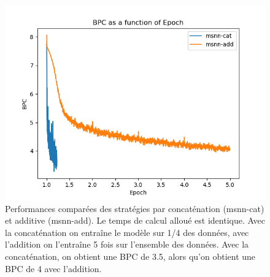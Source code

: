 \begin{figure}[H]
	\centering
	\includegraphics[width=\textwidth]{parts/appendix/reports-gmsnn/docs_esteban-latex/test_reports/comparative-bpc-msnn-det-msnn-cat.png}
	\caption[Performances comparées des stratégies additive et par concaténation]{Performances comparées des stratégies par concaténation (msnn-cat) et additive (msnn-add). Le temps de calcul alloué est identique. Avec la concaténation on entraîne le modèle sur 1/4 des données, avec l'addition on l'entraîne 5 fois sur l'ensemble des données. Avec la concaténation, on obtient une BPC de 3.5, alors qu'on obtient une BPC de 4 avec l'addition.}\label{fig:addcat}
\end{figure}